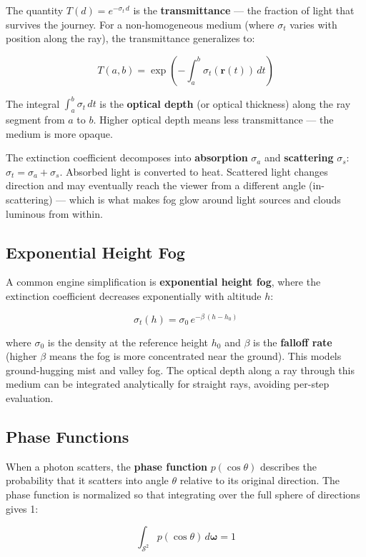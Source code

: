 \documentclass[
  11pt,
  letterpaper,
  DIV=11,
  numbers=noendperiod,
  twoside,
  open=right]{scrreprt}
\begin{document}
The quantity \(T(d) = e^{-\sigma_t \, d}\) is the \textbf{transmittance}
--- the fraction of light that survives the journey. For a
non-homogeneous medium (where \(\sigma_t\) varies with position along
the ray), the transmittance generalizes to:

\[
T(a, b) = \exp\left(-\int_a^b \sigma_t(\mathbf{r}(t)) \, dt\right)
\]

The integral \(\int_a^b \sigma_t \, dt\) is the \textbf{optical depth}
(or optical thickness) along the ray segment from \(a\) to \(b\). Higher
optical depth means less transmittance --- the medium is more opaque.

The extinction coefficient decomposes into \textbf{absorption}
\(\sigma_a\) and \textbf{scattering} \(\sigma_s\):
\(\sigma_t = \sigma_a + \sigma_s\). Absorbed light is converted to heat.
Scattered light changes direction and may eventually reach the viewer
from a different angle (in-scattering) --- which is what makes fog glow
around light sources and clouds luminous from within.

\subsection{Exponential Height Fog}\label{exponential-height-fog}

A common engine simplification is \textbf{exponential height fog}, where
the extinction coefficient decreases exponentially with altitude \(h\):

\[
\sigma_t(h) = \sigma_0 \, e^{-\beta \, (h - h_0)}
\]

where \(\sigma_0\) is the density at the reference height \(h_0\) and
\(\beta\) is the \textbf{falloff rate} (higher \(\beta\) means the fog
is more concentrated near the ground). This models ground-hugging mist
and valley fog. The optical depth along a ray through this medium can be
integrated analytically for straight rays, avoiding per-step evaluation.

\subsection{Phase Functions}\label{phase-functions}

When a photon scatters, the \textbf{phase function} \(p(\cos\theta)\)
describes the probability that it scatters into angle \(\theta\)
relative to its original direction. The phase function is normalized so
that integrating over the full sphere of directions gives 1:

\[
\int_{\mathcal{S}^2} p(\cos\theta) \, d\boldsymbol{\omega} = 1
\]
\end{document}
